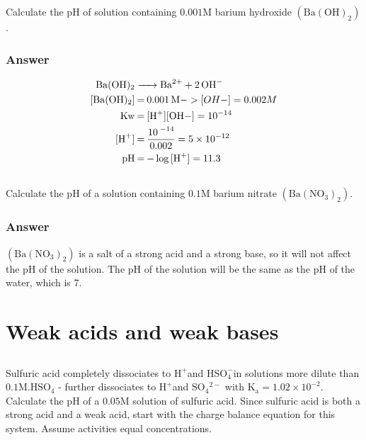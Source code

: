 \documentclass[12pt]{article}
\begin{document}
\subsection{}
Calculate the $\mathrm{pH}$ of solution containing $0.001 \mathrm{M}$ barium hydroxide $\left(\mathrm{Ba}(\mathrm{OH})_{2}\right)$.
\subsubsection{Answer}
\begin{align*}
  \ce{Ba(OH)2 &-> Ba^2+ + 2OH-} \\
  \ce{[Ba(OH)2] & = 0.001 M} -> \ce [OH-] = 0.002 M \\
  \ce{Kw & = [H+][OH-]} = 10^{-14} \\
  \ce{[H+] & = \frac{10^{-14}}{0.002}} = 5 \times 10^{-12} \\
  \ce{pH & = -\log[H+]} = 11.3
\end{align*}

\subsection{}

Calculate the $\mathrm{pH}$ of a solution containing $0.1 \mathrm{M}$ barium nitrate $\left(\mathrm{Ba}\left(\mathrm{NO}_{3}\right)_{2}\right)$.
\subsubsection{Answer}
$\left(\mathrm{Ba}\left(\mathrm{NO}_{3}\right)_{2}\right)$ is a salt of a strong acid and a strong base, so it will not affect the $\mathrm{pH}$ of the solution. The $\mathrm{pH}$ of the solution will be the same as the $\mathrm{pH}$ of the water, which is 7.

\section{Weak acids and weak bases}
\subsection{}
Sulfuric acid completely dissociates to $\mathrm{H}^{+}$and $\mathrm{HSO}_{4}^{-}$in solutions more dilute than $0.1 \mathrm{M} . \mathrm{HSO}_{4}$ - further dissociates to $\mathrm{H}^{+}$and $\mathrm{SO}_{4}{ }^{2-}$ with $\mathrm{K}_{\mathrm{a}}=1.02 \times 10^{-2}$. Calculate the $\mathrm{pH}$ of a $0.05 \mathrm{M}$ solution of sulfuric acid. Since sulfuric acid is both a strong acid and a weak acid, start with the charge balance equation for this system. Assume activities equal concentrations.
\end{document}
